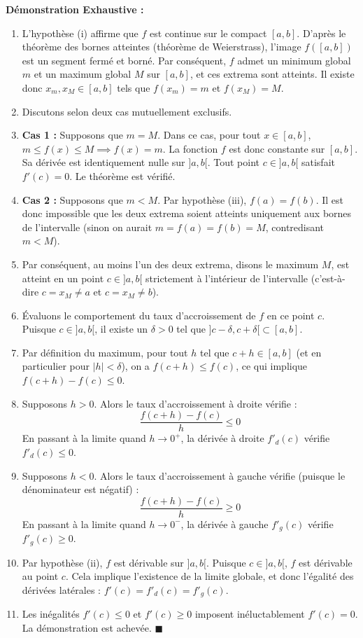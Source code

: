 \documentclass[11pt,a4paper]{article}
\begin{document}
\textbf{Démonstration Exhaustive :}
\begin{enumerate}
\item L'hypothèse (i) affirme que $f$ est continue sur le compact $[a, b]$. D'après le théorème des bornes atteintes (théorème de Weierstrass), l'image $f([a, b])$ est un segment fermé et borné. Par conséquent, $f$ admet un minimum global $m$ et un maximum global $M$ sur $[a, b]$, et ces extrema sont atteints. Il existe donc $x_m, x_M \in [a, b]$ tels que $f(x_m) = m$ et $f(x_M) = M$.
\item Discutons selon deux cas mutuellement exclusifs.
\item \textbf{Cas 1 :} Supposons que $m = M$. Dans ce cas, pour tout $x \in [a, b]$, $m \leq f(x) \leq M \implies f(x) = m$. La fonction $f$ est donc constante sur $[a, b]$. Sa dérivée est identiquement nulle sur $]a, b[$. Tout point $c \in ]a, b[$ satisfait $f'(c) = 0$. Le théorème est vérifié.
\item \textbf{Cas 2 :} Supposons que $m < M$. Par hypothèse (iii), $f(a) = f(b)$. Il est donc impossible que les deux extrema soient atteints uniquement aux bornes de l'intervalle (sinon on aurait $m = f(a) = f(b) = M$, contredisant $m < M$).
\item Par conséquent, au moins l'un des deux extrema, disons le maximum $M$, est atteint en un point $c \in ]a, b[$ strictement à l'intérieur de l'intervalle (c'est-à-dire $c = x_M \neq a$ et $c = x_M \neq b$).
\item Évaluons le comportement du taux d'accroissement de $f$ en ce point $c$. Puisque $c \in ]a, b[$, il existe un $\delta > 0$ tel que $]c-\delta, c+\delta[ \subset [a, b]$.
\item Par définition du maximum, pour tout $h$ tel que $c+h \in [a, b]$ (et en particulier pour $|h| < \delta$), on a $f(c+h) \leq f(c)$, ce qui implique $f(c+h) - f(c) \leq 0$.
\item Supposons $h > 0$. Alors le taux d'accroissement à droite vérifie :
   \[  \frac{f(c+h) - f(c)}{h} \leq 0  \]
   En passant à la limite quand $h \to 0^+$, la dérivée à droite $f'_d(c)$ vérifie $f'_d(c) \leq 0$.
\item Supposons $h < 0$. Alors le taux d'accroissement à gauche vérifie (puisque le dénominateur est négatif) :
   \[  \frac{f(c+h) - f(c)}{h} \geq 0  \]
   En passant à la limite quand $h \to 0^-$, la dérivée à gauche $f'_g(c)$ vérifie $f'_g(c) \geq 0$.
\item Par hypothèse (ii), $f$ est dérivable sur $]a, b[$. Puisque $c \in ]a, b[$, $f$ est dérivable au point $c$. Cela implique l'existence de la limite globale, et donc l'égalité des dérivées latérales : $f'(c) = f'_d(c) = f'_g(c)$.
\item Les inégalités $f'(c) \leq 0$ et $f'(c) \geq 0$ imposent inéluctablement $f'(c) = 0$. La démonstration est achevée. $\blacksquare$
\end{enumerate}
\end{document}
